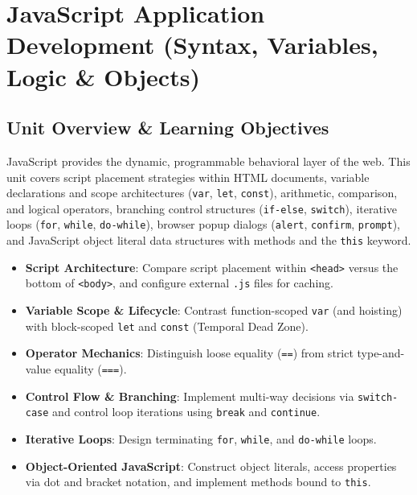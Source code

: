 \chapter{JavaScript Application Development (Syntax, Variables, Logic \& Objects)}
\label{chap:javascript-application-development}

\section{Unit Overview \& Learning Objectives}

\begin{conceptbox}
JavaScript provides the dynamic, programmable behavioral layer of the web. This unit covers script placement strategies within HTML documents, variable declarations and scope architectures (\texttt{var}, \texttt{let}, \texttt{const}), arithmetic, comparison, and logical operators, branching control structures (\texttt{if-else}, \texttt{switch}), iterative loops (\texttt{for}, \texttt{while}, \texttt{do-while}), browser popup dialogs (\texttt{alert}, \texttt{confirm}, \texttt{prompt}), and JavaScript object literal data structures with methods and the \texttt{this} keyword.
\end{conceptbox}

\begin{itemize}[leftmargin=1.5em]
    \item \textbf{Script Architecture}: Compare script placement within \texttt{<head>} versus the bottom of \texttt{<body>}, and configure external \texttt{.js} files for caching.
    \item \textbf{Variable Scope \& Lifecycle}: Contrast function-scoped \texttt{var} (and hoisting) with block-scoped \texttt{let} and \texttt{const} (Temporal Dead Zone).
    \item \textbf{Operator Mechanics}: Distinguish loose equality (\texttt{==}) from strict type-and-value equality (\texttt{===}).
    \item \textbf{Control Flow \& Branching}: Implement multi-way decisions via \texttt{switch-case} and control loop iterations using \texttt{break} and \texttt{continue}.
    \item \textbf{Iterative Loops}: Design terminating \texttt{for}, \texttt{while}, and \texttt{do-while} loops.
    \item \textbf{Object-Oriented JavaScript}: Construct object literals, access properties via dot and bracket notation, and implement methods bound to \texttt{this}.
\end{itemize}

